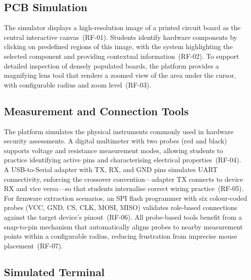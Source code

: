 \subsection{PCB Simulation}\label{subsec:req-pcb}

The simulator displays a high-resolution image of a printed circuit board as the central interactive canvas~(RF-01). Students identify hardware components by clicking on predefined regions of this image, with the system highlighting the selected component and providing contextual information~(RF-02). To support detailed inspection of densely populated boards, the platform provides a magnifying lens tool that renders a zoomed view of the area under the cursor, with configurable radius and zoom level~(RF-03).

\subsection{Measurement and Connection Tools}\label{subsec:req-tools}

The platform simulates the physical instruments commonly used in hardware security assessments. A digital multimeter with two probes (red and black) supports voltage and resistance measurement modes, allowing students to practice identifying active pins and characterising electrical properties~(RF-04). A USB-to-Serial adapter with TX, RX, and GND pins simulates UART connectivity, enforcing the crossover convention---adapter TX connects to device RX and vice versa---so that students internalise correct wiring practice~(RF-05). For firmware extraction scenarios, an SPI flash programmer with six colour-coded probes (VCC, GND, CS, CLK, MOSI, MISO) validates role-based connections against the target device's pinout~(RF-06). All probe-based tools benefit from a snap-to-pin mechanism that automatically aligns probes to nearby measurement points within a configurable radius, reducing frustration from imprecise mouse placement~(RF-07).

\subsection{Simulated Terminal}\label{subsec:req-terminal}

